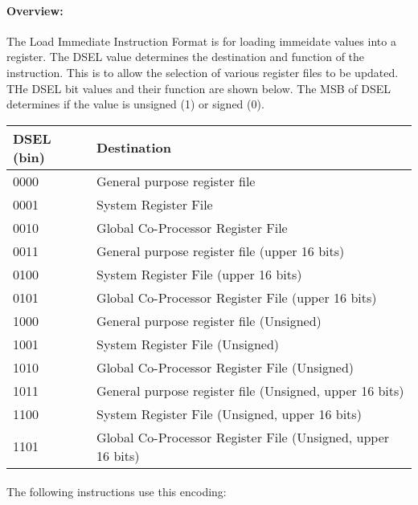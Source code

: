 \documentclass[letterpaper, 11pt]{article}
\begin{document}
\paragraph{Overview:}The Load Immediate Instruction Format is for loading immeidate values into a register.
The DSEL value determines the destination and function of the instruction. This is to allow the selection
of various register files to be updated. THe DSEL bit values and their function are shown below. 
The MSB of DSEL determines if the value is unsigned (1) or signed (0). \\
\begin{tabular}{l|l}
		DSEL (bin) & Destination \\ \hline
		0000 & General purpose register file \\
		0001 & System Register File \\
		0010 & Global Co-Processor Register File \\ 
		0011 & General purpose register file (upper 16 bits) \\
		0100 & System Register File (upper 16 bits)\\
		0101 & Global Co-Processor Register File (upper 16 bits)\\ 
		1000 & General purpose register file  (Unsigned)\\
		1001 & System Register File (Unsigned)\\
		1010 & Global Co-Processor Register File (Unsigned)\\ 
		1011 & General purpose register file  (Unsigned, upper 16 bits)\\
		1100 & System Register File (Unsigned, upper 16 bits)\\
		1101 & Global Co-Processor Register File (Unsigned, upper 16 bits)\\ 
		
		\end{tabular}

\paragraph{}The following instructions use this encoding: \\
\end{document}
